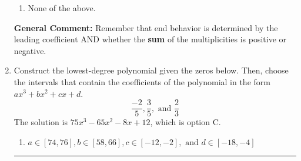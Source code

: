 \documentclass{extbook}[14pt]
\newcommand{\litem}[1]{\item #1

\rule{\textwidth}{0.4pt}}
\begin{document}
\begin{enumerate}
{\begin{enumerate}[label=\Alph*.]
\item None of the above.\end{enumerate}
\textbf{General Comment:} Remember that end behavior is determined by the leading coefficient AND whether the \textbf{sum} of the multiplicities is positive or negative.
}
\litem{
Construct the lowest-degree polynomial given the zeros below. Then, choose the intervals that contain the coefficients of the polynomial in the form $ax^3+bx^2+cx+d$.
\[ \frac{-2}{5}, \frac{3}{5}, \text{ and } \frac{2}{3} \]
The solution is \( 75x^{3} -65 x^{2} -8 x + 12 \), which is option C.\begin{enumerate}[label=\Alph*.]
\item \( a \in [74, 76], b \in [58, 66], c \in [-12, -2], \text{ and } d \in [-18, -4] \)


\end{enumerate}}
\end{enumerate}
\end{document}
